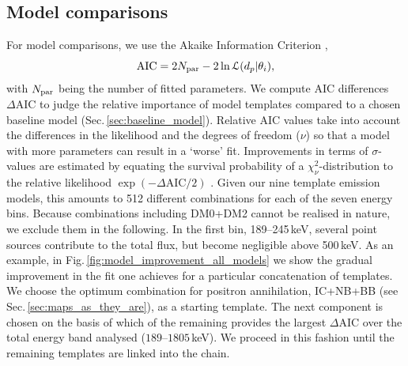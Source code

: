 \documentclass[doublespace,draft,nopageskip]{VTthesis} %
\begin{document}
	\subsection{Model comparisons}\label{sec:model_comparisons}\label{sec:model_combinations}
	For model comparisons, we use the Akaike Information Criterion \citep[AIC;][]{Akaike1974_AIC,Burnham2004_AICBIC},
	\begin{equation}
		\mathrm{AIC} = 2 N_{\rm par} - 2 \ln\mathcal{L}(d_p|\theta_i)\mathrm{,}
		\label{eq:AICc}
	\end{equation}
	\noindent with $N_{\rm par}$ being the number of fitted parameters.
	We compute AIC differences $\Delta\mathrm{AIC}$ to judge the relative importance of model templates compared to a chosen baseline model (Sec.\,\ref{sec:baseline_model}).
	Relative AIC values take into account the differences in the likelihood and the degrees of freedom ($\nu$) so that a model with more parameters can result in a `worse' fit.
	Improvements in terms of $\sigma$-values are estimated by equating the survival probability of a $\chi^2_{\nu}$-distribution to the relative likelihood $\exp\left(-\Delta\mathrm{AIC}/2\right)$ \citep{Burnham2004_AICBIC}.
	Given our nine template emission models, this amounts to 512 different combinations for each of the seven energy bins.
	Because combinations including DM0+DM2 cannot be realised in nature, we exclude them in the following.
	In the first bin, 189--245\,keV, several point sources contribute to the total flux, but become negligible above 500\,keV.	
	As an example, in Fig.\,\ref{fig:model_improvement_all_models} we show the 
	gradual improvement in the fit one achieves for a particular concatenation of templates.
	We choose the optimum combination for positron annihilation, IC+NB+BB (see Sec.\,\ref{sec:maps_as_they_are}), as a starting template.
	The next component is chosen on the basis of which of the remaining provides the largest $\Delta\mathrm{AIC}$ over the total energy band analysed ($189$--$1805$\,keV).
	We proceed in this fashion until the remaining templates are linked into the chain.
\end{document}
